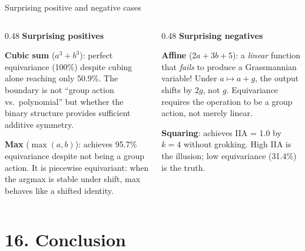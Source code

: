 \documentclass[aspectratio=169,11pt]{beamer}
\begin{document}
\begin{frame}{Surprising positive and negative cases}

\begin{columns}[T]
\begin{column}{0.48\textwidth}
\textbf{\textcolor{pass}{Surprising positives}}

\vspace{0.3em}
{\small \textbf{Cubic sum} ($a^3 + b^3$): perfect equivariance (100\%) despite cubing alone reaching only 50.9\%. The boundary is not ``group action vs.\ polynomial'' but whether the binary structure provides sufficient additive symmetry.}

\vspace{0.5em}
{\small \textbf{Max} ($\max(a,b)$): achieves 95.7\% equivariance despite not being a group action. It is piecewise equivariant: when the argmax is stable under shift, max behaves like a shifted identity.}
\end{column}
\begin{column}{0.48\textwidth}
\textbf{\textcolor{fail}{Surprising negatives}}

\vspace{0.3em}
{\small \textbf{Affine} ($2a + 3b + 5$): a \emph{linear} function that \emph{fails} to produce a Grassmannian variable! Under $a \mapsto a + g$, the output shifts by $2g$, not $g$. Equivariance requires the operation to be a group action, not merely linear.}

\vspace{0.5em}
{\small \textbf{Squaring}: achieves IIA = 1.0 by $k = 4$ without grokking. High IIA is the illusion; low equivariance (31.4\%) is the truth.}
\end{column}
\end{columns}
\end{frame}

\hypertarget{sec16}{}
\section{16. Conclusion}
\end{document}

